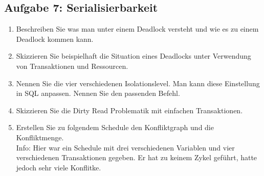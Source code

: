 \newpage
\subsection{Aufgabe 7: Serialisierbarkeit}
\label{sec:Aufgabe7}
\begin{enumerate}[label=\alph*)]
    \item Beschreiben Sie was man unter einem Deadlock versteht und wie es zu
        einem Deadlock kommen kann.
    \item Skizzieren Sie beispielhaft die Situation eines Deadlocks unter
        Verwendung von Transaktionen und Ressourcen.
    \item Nennen Sie die vier verschiedenen Isolationslevel. Man kann diese
        Einstellung in SQL anpassen. Nennen Sie den passenden Befehl.
    \item Skizzieren Sie die Dirty Read Problematik mit einfachen Transaktionen.
    \item Erstellen Sie zu folgendem Schedule den Konfliktgraph und die Konfliktmenge.\\
          Info: Hier war ein Schedule mit drei verschiedenen Variablen und vier
          verschiedenen Transaktionen gegeben. Er hat zu keinem Zykel geführt,
          hatte jedoch sehr viele Konflitke.
\end{enumerate}
